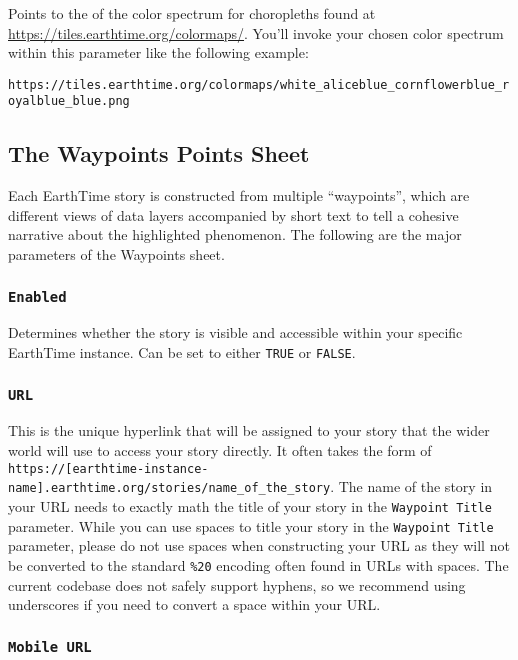 \documentclass[
  12pt,
]{krantz}
\begin{document}
Points to the of the color spectrum for choropleths found at \url{https://tiles.earthtime.org/colormaps/}. You'll invoke your chosen color spectrum within this parameter like the following example:

\texttt{https://tiles.earthtime.org/colormaps/white\_aliceblue\_cornflowerblue\_royalblue\_blue.png}

\hypertarget{the-waypoints-points-sheet}{%
\subsection{The Waypoints Points Sheet}\label{the-waypoints-points-sheet}}

Each EarthTime story is constructed from multiple ``waypoints'', which are different views of data layers accompanied by short text to tell a cohesive narrative about the highlighted phenomenon. The following are the major parameters of the Waypoints sheet.

\hypertarget{enabled-1}{%
\subsubsection*{\texorpdfstring{\texttt{Enabled}}{Enabled}}\label{enabled-1}}


Determines whether the story is visible and accessible within your specific EarthTime instance. Can be set to either \texttt{TRUE} or \texttt{FALSE}.

\hypertarget{url-1}{%
\subsubsection*{\texorpdfstring{\texttt{URL}}{URL}}\label{url-1}}


This is the unique hyperlink that will be assigned to your story that the wider world will use to access your story directly. It often takes the form of \texttt{https://{[}earthtime-instance-name{]}.earthtime.org/stories/name\_of\_the\_story}. The name of the story in your URL needs to exactly math the title of your story in the \texttt{Waypoint\ Title} parameter. While you can use spaces to title your story in the \texttt{Waypoint\ Title} parameter, please do not use spaces when constructing your URL as they will not be converted to the standard \texttt{\%20} encoding often found in URLs with spaces. The current codebase does not safely support hyphens, so we recommend using underscores if you need to convert a space within your URL.

\hypertarget{mobile-url}{%
\subsubsection*{\texorpdfstring{\texttt{Mobile\ URL}}{Mobile URL}}\label{mobile-url}}
\end{document}
